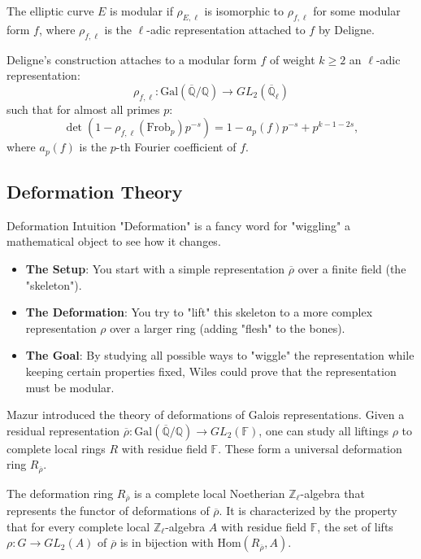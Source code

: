 The elliptic curve $E$ is modular if $\rho_{E,\ell}$ is isomorphic to $\rho_{f,\ell}$ for some modular form $f$, where $\rho_{f,\ell}$ is the $\ell$-adic representation attached to $f$ by Deligne.

Deligne's construction attaches to a modular form $f$ of weight $k \geq 2$ an $\ell$-adic representation:
\[
\rho_{f,\ell}: \mathrm{Gal}(\overline{\mathbb{Q}}/\mathbb{Q}) \to GL_2(\overline{\mathbb{Q}}_\ell)
\]
such that for almost all primes $p$:
\[
\det(1 - \rho_{f,\ell}(\mathrm{Frob}_p) p^{-s}) = 1 - a_p(f) p^{-s} + p^{k-1-2s},
\]
where $a_p(f)$ is the $p$-th Fourier coefficient of $f$.

\subsection{Deformation Theory}

\begin{knowledgebridge}{Deformation Intuition}
"Deformation" is a fancy word for "wiggling" a mathematical object to see how it changes.
\begin{itemize}
    \item \textbf{The Setup}: You start with a simple representation $\overline{\rho}$ over a finite field (the "skeleton").
    \item \textbf{The Deformation}: You try to "lift" this skeleton to a more complex representation $\rho$ over a larger ring (adding "flesh" to the bones).
    \item \textbf{The Goal}: By studying all possible ways to "wiggle" the representation while keeping certain properties fixed, Wiles could prove that the representation must be modular.
\end{itemize}
\end{knowledgebridge}

Mazur introduced the theory of deformations of Galois representations. Given a residual representation $\overline{\rho}: \mathrm{Gal}(\overline{\mathbb{Q}}/\mathbb{Q}) \to GL_2(\mathbb{F})$, one can study all liftings $\rho$ to complete local rings $R$ with residue field $\mathbb{F}$. These form a universal deformation ring $R_{\overline{\rho}}$.


The deformation ring $R_{\overline{\rho}}$ is a complete local Noetherian $\mathbb{Z}_\ell$-algebra that represents the functor of deformations of $\overline{\rho}$. It is characterized by the property that for every complete local $\mathbb{Z}_\ell$-algebra $A$ with residue field $\mathbb{F}$, the set of lifts $\rho: G \to GL_2(A)$ of $\overline{\rho}$ is in bijection with $\mathrm{Hom}(R_{\overline{\rho}}, A)$.

